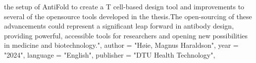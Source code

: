 {the setup of AntiFold to create a T cell-based design tool and improvements to several of the opensource tools developed in the thesis.The open-sourcing of these advancements could represent a significant leap forward in antibody design, providing powerful, accessible tools for researchers and opening new possibilities in medicine and biotechnology.",
author = "H{\o}ie, {Magnus Haraldson}",
year = "2024",
language = "English",
publisher = "DTU Health Technology",
}
